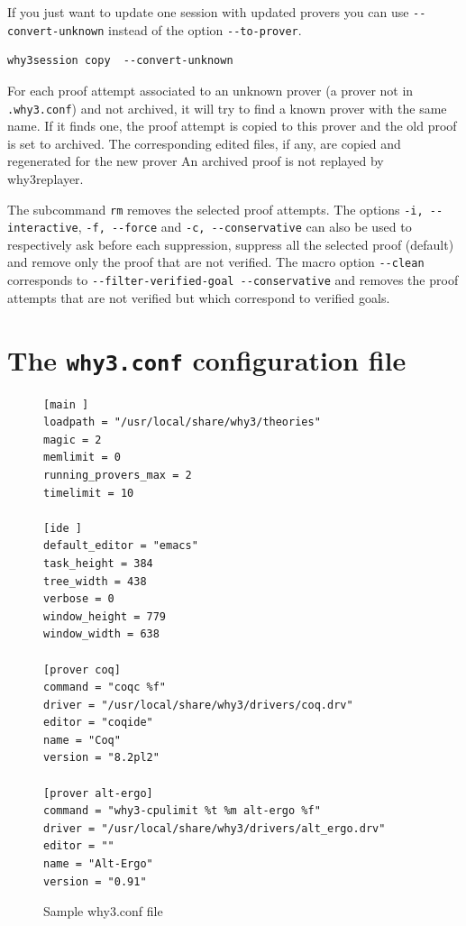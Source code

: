 If you just want to update one session with updated provers you can
use \verb|--convert-unknown| instead of the option \verb|--to-prover|.
\begin{verbatim}
why3session copy  --convert-unknown
\end{verbatim}
For each proof attempt associated to an unknown prover (a prover not in
\verb|.why3.conf|) and not archived, it will try to find a known prover
with the same name. If it finds one, the proof attempt is copied to this
prover and the old proof is set to archived. The corresponding edited
files, if any, are copied and regenerated for the new prover An archived
proof is not replayed by why3replayer.

The subcommand \texttt{rm} removes the selected proof
attempts. The options \verb|-i, --interactive|, \verb|-f, --force| and
\verb|-c, --conservative| can also be used to respectively ask before
each suppression, suppress all the selected proof (default) and remove
only the proof that are not verified. The macro option \verb|--clean|
corresponds to \verb|--filter-verified-goal --conservative| and
removes the proof attempts that are not verified but which correspond
to verified goals.


\section{The \texttt{why3.conf} configuration file}
\label{sec:whyconffile}


\begin{figure}[t]
\begin{verbatim}
[main ]
loadpath = "/usr/local/share/why3/theories"
magic = 2
memlimit = 0
running_provers_max = 2
timelimit = 10

[ide ]
default_editor = "emacs"
task_height = 384
tree_width = 438
verbose = 0
window_height = 779
window_width = 638

[prover coq]
command = "coqc %f"
driver = "/usr/local/share/why3/drivers/coq.drv"
editor = "coqide"
name = "Coq"
version = "8.2pl2"

[prover alt-ergo]
command = "why3-cpulimit %t %m alt-ergo %f"
driver = "/usr/local/share/why3/drivers/alt_ergo.drv"
editor = ""
name = "Alt-Ergo"
version = "0.91"
\end{verbatim}
  \caption{Sample why3.conf file}
\label{fig:why3conf}
\end{figure}



